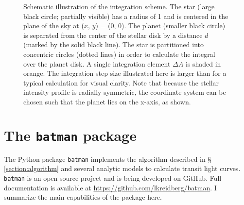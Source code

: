 \documentclass[12pt,preprint]{aastex}
\newcommand*{\blue}{\textcolor{blue}}
\begin{document}
\begin{figure}
\caption{Schematic illustration of the integration scheme. The star (large black circle; partially visible) has a radius of 1 and is centered in the plane of the sky at ($x$, $y$) = (0, 0). The planet (smaller black circle) is separated from the center of the stellar disk by a distance $d$ (marked by the solid black line).  The star is partitioned into concentric circles (dotted lines) in order to calculate the integral over the planet disk.  A single integration element $\Delta A$ is shaded in orange. The integration step size illustrated here is larger than for a typical calculation for visual clarity.  Note that because the stellar intensity profile is radially symmetric, the coordinate system can be chosen such that the planet lies on the x-axis, as shown.}
\label{fig:integration}
\end{figure}

\section{The \texttt{batman} package}
\label{section:batman}
The Python package \texttt{batman} implements the algorithm described in \S\,\ref{section:algorithm} and several analytic models to calculate transit light curves.  \texttt{batman} is an open source project and is being developed on GitHub.  Full documentation is available at \blue{\url{https://github.com/lkreidberg/batman}}. I summarize the main capabilities of the package here.
\end{document}
